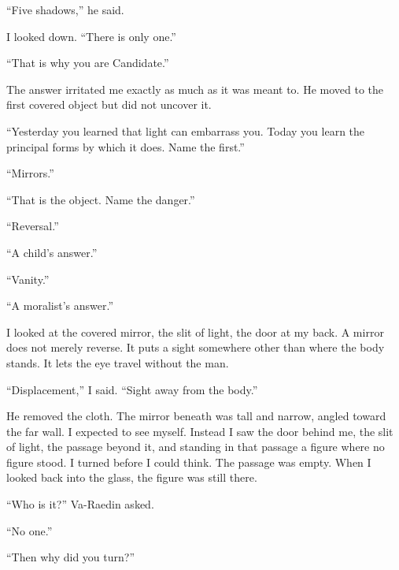 ``Five shadows,'' he said.\par

I looked down. ``There is only one.''\par

``That is why you are Candidate.''\par

The answer irritated me exactly as much as it was meant to. He moved to the first covered object but did not uncover it.\par

``Yesterday you learned that light can embarrass you. Today you learn the principal forms by which it does. Name the first.''\par

``Mirrors.''\par

``That is the object. Name the danger.''\par

``Reversal.''\par

``A child's answer.''\par

``Vanity.''\par

``A moralist's answer.''\par

I looked at the covered mirror, the slit of light, the door at my back. A mirror does not merely reverse. It puts a sight somewhere other than where the body stands. It lets the eye travel without the man.\par

``Displacement,'' I said. ``Sight away from the body.''\par

He removed the cloth. The mirror beneath was tall and narrow, angled toward the far wall. I expected to see myself. Instead I saw the door behind me, the slit of light, the passage beyond it, and standing in that passage a figure where no figure stood. I turned before I could think. The passage was empty. When I looked back into the glass, the figure was still there.\par

``Who is it?'' Va-Raedin asked.\par

``No one.''\par

``Then why did you turn?''\par


